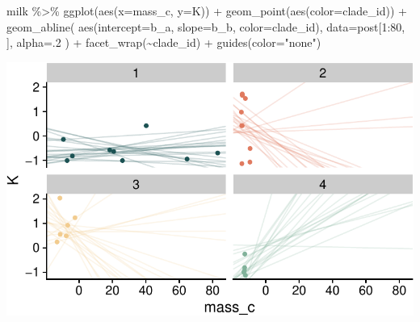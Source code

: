 \documentclass[
  letterpaper,
  DIV=11,
  numbers=noendperiod]{scrartcl}
\newenvironment{Shaded}{\begin{snugshade}}{\end{snugshade}}
\newcommand{\AttributeTok}[1]{\textcolor[rgb]{0.40,0.45,0.13}{#1}}
\newcommand{\DecValTok}[1]{\textcolor[rgb]{0.68,0.00,0.00}{#1}}
\newcommand{\FunctionTok}[1]{\textcolor[rgb]{0.28,0.35,0.67}{#1}}
\newcommand{\NormalTok}[1]{\textcolor[rgb]{0.00,0.23,0.31}{#1}}
\newcommand{\SpecialCharTok}[1]{\textcolor[rgb]{0.37,0.37,0.37}{#1}}
\newcommand{\StringTok}[1]{\textcolor[rgb]{0.13,0.47,0.30}{#1}}
\begin{document}
\begin{Shaded}
\begin{Highlighting}[]
\NormalTok{milk }\SpecialCharTok{\%\textgreater{}\%} 
  \FunctionTok{ggplot}\NormalTok{(}\FunctionTok{aes}\NormalTok{(}\AttributeTok{x=}\NormalTok{mass\_c, }\AttributeTok{y=}\NormalTok{K)) }\SpecialCharTok{+}
  \FunctionTok{geom\_point}\NormalTok{(}\FunctionTok{aes}\NormalTok{(}\AttributeTok{color=}\NormalTok{clade\_id)) }\SpecialCharTok{+} 
  \FunctionTok{geom\_abline}\NormalTok{(}
    \FunctionTok{aes}\NormalTok{(}\AttributeTok{intercept=}\NormalTok{b\_a, }\AttributeTok{slope=}\NormalTok{b\_b, }\AttributeTok{color=}\NormalTok{clade\_id), }
    \AttributeTok{data=}\NormalTok{post[}\DecValTok{1}\SpecialCharTok{:}\DecValTok{80}\NormalTok{, ],}
    \AttributeTok{alpha=}\NormalTok{.}\DecValTok{2}
\NormalTok{  ) }\SpecialCharTok{+}
  \FunctionTok{facet\_wrap}\NormalTok{(}\SpecialCharTok{\textasciitilde{}}\NormalTok{clade\_id) }\SpecialCharTok{+}
  \FunctionTok{guides}\NormalTok{(}\AttributeTok{color=}\StringTok{"none"}\NormalTok{)}
\end{Highlighting}
\end{Shaded}

\includegraphics[width=17.1875in,height=\textheight]{lecture02-2_files/figure-pdf/unnamed-chunk-20-1.pdf}
\end{document}
